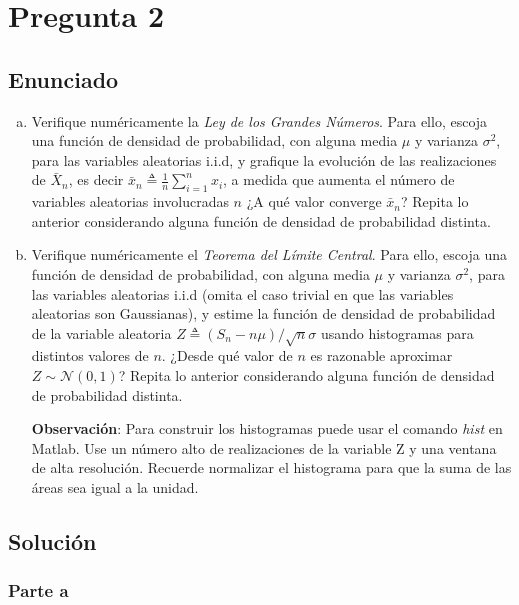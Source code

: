 \section{ Pregunta 2 }
	\subsection{ Enunciado }
		\begin{enumerate}[a)]
			\item Verifique numéricamente la \textit{Ley de los Grandes Números}. Para ello, escoja una función de densidad de probabilidad, con alguna media $\mu$ y varianza $\sigma^2$, para las variables aleatorias i.i.d, y grafique la evolución de las realizaciones de $\bar X_n$, es decir $\bar x_n \triangleq \frac{1}{n}\sum_{i=1}^n x_i$, a medida que aumenta el número de variables aleatorias involucradas $n$ ¿A qué valor converge $\bar x_n$? Repita lo anterior considerando alguna función de densidad de probabilidad distinta.


			\item Verifique numéricamente el \textit{Teorema del Límite Central}. Para ello, escoja una función de densidad de probabilidad, con alguna media $\mu$ y varianza $\sigma^2$, para las variables aleatorias i.i.d (omita el caso trivial en que las variables aleatorias son Gaussianas), y estime la función de densidad de probabilidad de la variable aleatoria $Z\triangleq (S_n -n\mu)/\sqrt{n}\sigma$ usando histogramas para distintos valores de $n$. ¿Desde qué valor de $n$ es razonable aproximar $Z \sim \mathcal{ N } (0, 1)$? Repita lo anterior considerando alguna función de densidad de probabilidad distinta.

			\textbf{Observación}: Para construir los histogramas puede usar el comando \textit{hist} en Matlab. Use un número alto de realizaciones de la variable Z y  una ventana de alta resolución. Recuerde normalizar el histograma para que la suma de las áreas sea igual a la unidad. 
		\end{enumerate}

	\subsection{ Solución }

		\subsubsection {Parte a}
		
